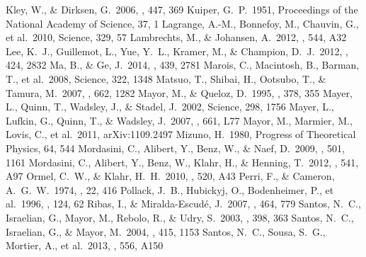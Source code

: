 \documentclass[twocolumn, dvipdfmx]{aastex62}
\begin{document}
\begin{CJK*}{UTF8}{min}
\begin{thebibliography}{}
 Kley, W., \& Dirksen, G.\ 2006, \aap, 447, 369
 Kuiper, G.~P.\ 1951, Proceedings of the National Academy of Science, 37, 1
 Lagrange, A.-M., Bonnefoy, M., Chauvin, G., et al.\ 2010, Science, 329, 57
 Lambrechts, M., \& Johansen, A.\ 2012, \aap, 544, A32
 Lee, K.~J., Guillemot, L., Yue, Y.~L., Kramer, M., \& Champion, D.~J.\ 2012, \mnras, 424, 2832
 Ma, B., \& Ge, J.\ 2014, \mnras, 439, 2781
 Marois, C., Macintosh, B., Barman, T., et al.\ 2008, Science, 322, 1348
 Matsuo, T., Shibai, H., Ootsubo, T., \& Tamura, M.\ 2007, \apj, 662, 1282
 Mayor, M., \& Queloz, D.\ 1995, \nat, 378, 355
 Mayer, L., Quinn, T., Wadsley, J., \& Stadel, J.\ 2002, Science, 298, 1756
 Mayer, L., Lufkin, G., Quinn, T., \& Wadsley, J.\ 2007, \apjl, 661, L77
 Mayor, M., Marmier, M., Lovis, C., et al.\ 2011, arXiv:1109.2497
 Mizuno, H.\ 1980, Progress of Theoretical Physics, 64, 544
 Mordasini, C., Alibert, Y., Benz, W., \& Naef, D.\ 2009, \aap, 501, 1161
 Mordasini, C., Alibert, Y., Benz, W., Klahr, H., \& Henning, T.\ 2012, \aap, 541, A97
 Ormel, C.~W., \& Klahr, H.~H.\ 2010, \aap, 520, A43
 Perri, F., \& Cameron, A.~G.~W.\ 1974, \icarus, 22, 416
 Pollack, J.~B., Hubickyj, O., Bodenheimer, P., et al.\ 1996, \icarus, 124, 62
 Ribas, I., \& Miralda-Escud{\'e}, J.\ 2007, \aap, 464, 779
 Santos, N.~C., Israelian, G., Mayor, M., Rebolo, R., \& Udry, S.\ 2003, \aap, 398, 363
 Santos, N.~C., Israelian, G., \& Mayor, M.\ 2004, \aap, 415, 1153
 Santos, N.~C., Sousa, S.~G., Mortier, A., et al.\ 2013, \aap, 556, A150

\end{thebibliography}
\end{CJK*}
\end{document}
